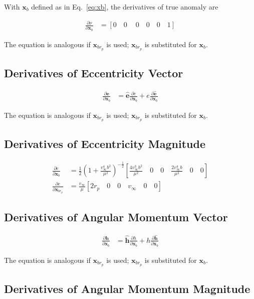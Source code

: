 \documentclass[]{article}
\newcommand{\vb}[1]{\bm{#1}} %
\newcommand{\vbh}[1]{\hat{\bm{#1}}} %
\newcommand{\pd}[2]{\frac{\partial #1}{\partial #2}} %
\newcommand{\xb}[0]{\vb{x}_b}
\newcommand{\xbrp}[0]{\vb{x}_{br_p}}
\begin{document}
With $\vb{x}_b$ defined as in Eq.~\eqref{eq:xb}, the derivatives of true anomaly are

\begin{align}
	\pd{\nu}{\vb{x}_b} &= \left[ 0 \quad 0 \quad \ 0 \quad 0 \quad 0 \quad 1 \right]
\end{align}

The equation is analogous if $\xbrp$ is used; $\xbrp$ is substituted for $\xb$.

\subsection{Derivatives of Eccentricity Vector}

\begin{align}
	\pd{\vb{e}}{\xb} &= \vbh{e} \pd{e}{\xb} + e \pd{\vbh{e}}{\xb}
\end{align}

The equation is analogous if $\xbrp$ is used; $\xbrp$ is substituted for $\xb$.

\subsection{Derivatives of Eccentricity Magnitude}

\begin{align}
	\pd{e}{\xb} &= \frac{1}{2} \left( 1 + \frac{v_{\infty}^4 b^2}{\mu^2} \right)^{-\frac{1}{2}} \left[ \frac{4 v_{\infty}^3 b^2}{\mu^2} \quad 0 \quad 0 \quad \frac{2 v_{\infty}^4 b}{\mu^2} \quad 0 \quad 0 \right] \\
	\pd{e}{\xbrp} &= \frac{v_{\infty}}{\mu} \left[ 2 r_p \quad 0 \quad 0 \quad v_{\infty} \quad 0 \quad 0 \right]
\end{align}

\subsection{Derivatives of Angular Momentum Vector}

\begin{align}
\pd{\vb{h}}{\xb} &= \vbh{h} \pd{h}{\xb} + h \pd{\vbh{h}}{\xb}
\end{align}

The equation is analogous if $\xbrp$ is used; $\xbrp$ is substituted for $\xb$.

\subsection{Derivatives of Angular Momentum Magnitude}
\end{document}
